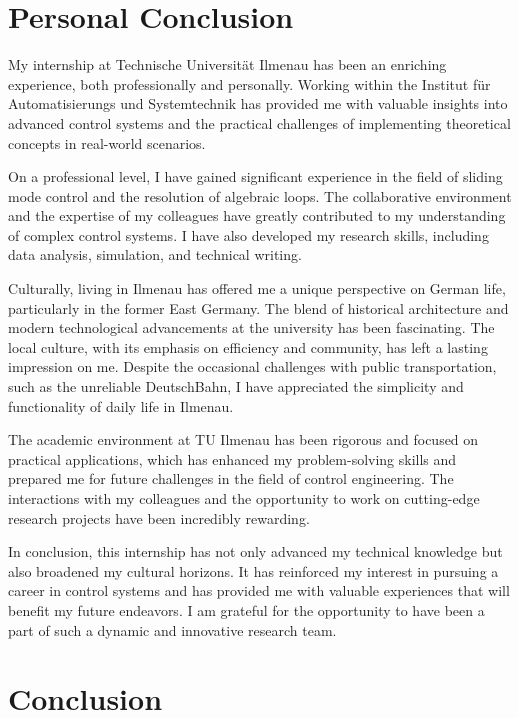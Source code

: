 
\chapter{Personal Conclusion}

My internship at Technische Universität Ilmenau has been an enriching experience, both professionally and personally. Working within the Institut für Automatisierungs und Systemtechnik has provided me with valuable insights into advanced control systems and the practical challenges of implementing theoretical concepts in real-world scenarios.

On a professional level, I have gained significant experience in the field of sliding mode control and the resolution of algebraic loops. The collaborative environment and the expertise of my colleagues have greatly contributed to my understanding of complex control systems. I have also developed my research skills, including data analysis, simulation, and technical writing.

Culturally, living in Ilmenau has offered me a unique perspective on German life, particularly in the former East Germany. The blend of historical architecture and modern technological advancements at the university has been fascinating. The local culture, with its emphasis on efficiency and community, has left a lasting impression on me. Despite the occasional challenges with public transportation, such as the unreliable DeutschBahn, I have appreciated the simplicity and functionality of daily life in Ilmenau.

The academic environment at TU Ilmenau has been rigorous and focused on practical applications, which has enhanced my problem-solving skills and prepared me for future challenges in the field of control engineering. The interactions with my colleagues and the opportunity to work on cutting-edge research projects have been incredibly rewarding.

In conclusion, this internship has not only advanced my technical knowledge but also broadened my cultural horizons. It has reinforced my interest in pursuing a career in control systems and has provided me with valuable experiences that will benefit my future endeavors. I am grateful for the opportunity to have been a part of such a dynamic and innovative research team.
\chapter*{Conclusion}

